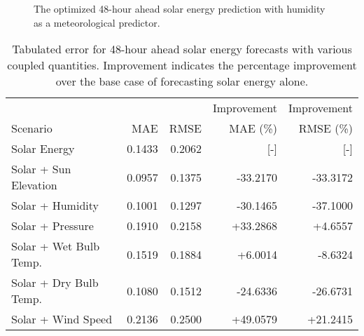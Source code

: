 \begin{figure*}[!ht]
  \centering
  
  \caption{The optimized 48-hour ahead solar energy prediction with humidity as a  meteorological
  predictor.}
  \label{fig:solar48}
\end{figure*}
  \begin{table*}[!ht]
    \centering
    \caption{Tabulated error for 48-hour ahead solar energy forecasts with various coupled quantities. Improvement indicates the percentage improvement over the base case of forecasting solar energy alone.}
    \label{tab:solar48}
    \begin{tabular}{l|r|r|r|r}
      &  & & Improvement & Improvement \\
      Scenario  & MAE & RMSE & MAE (\%) & RMSE (\%)\\
      \hline
      Solar Energy & 0.1433 &0.2062 & [-] & [-] \\
      Solar + Sun Elevation & 0.0957 & 0.1375 &  -33.2170 & -33.3172 \\
      Solar + Humidity & 0.1001 & 0.1297 & -30.1465 & -37.1000 \\
      Solar + Pressure & 0.1910 & 0.2158 & +33.2868 & +4.6557 \\
      Solar + Wet Bulb Temp. & 0.1519 & 0.1884 & +6.0014 & -8.6324 \\
      Solar + Dry Bulb Temp. & 0.1080 & 0.1512 & -24.6336 & -26.6731 \\
      Solar + Wind Speed & 0.2136 & 0.2500 & +49.0579 & +21.2415 \\
    \end{tabular}
  \end{table*}
